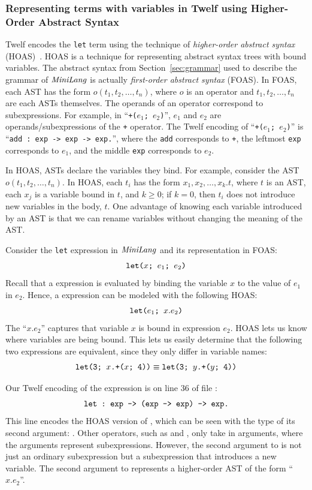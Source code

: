 \subsubsection{Representing terms with variables in Twelf
using Higher-Order Abstract Syntax}
\label{sec:twelf-hoas}

Twelf encodes the \texttt{let} term using the
technique of \emph{higher-order abstract syntax} (HOAS)~\cite{Twelf-HOAS}.
HOAS is a technique for representing abstract syntax trees
with bound variables.
The abstract syntax from Section~\ref{sec:grammar} used to describe
the grammar of $\mathit{MiniLang}$ is actually
\emph{first-order abstract syntax} (FOAS).
In FOAS, each AST has the form $o(t_1, t_2, \ldots, t_n)$,
where $o$ is an operator and $t_1, t_2, \ldots, t_n$ are each
ASTs themselves.
The operands of an operator correspond to subexpressions.
For example, in ``\texttt{+($e_1$; $e_2$)}'',
$e_1$ and $e_2$ are operands/subexpressions of the
\texttt{+} operator.
The Twelf encoding of ``\texttt{+($e_1$; $e_2$)}''
is ``\texttt{add : exp -> exp -> exp.}'',
where the \texttt{add} corresponds to \texttt{+},
the leftmost \texttt{exp} corresponds to $e_1$,
and the middle \texttt{exp} corresponds to $e_2$.

In HOAS, ASTs declare the variables they bind.
For example, consider the AST
$o(t_1, t_2, \ldots, t_n)$.
In HOAS, each $t_i$ has the form
$x_1, x_2, \ldots, x_k.t$, where $t$ is an AST,
each $x_j$ is a variable bound in $t$, and $k \geq 0$;
if $k = 0$, then $t_i$ does not introduce new variables in
the body, $t$.
One advantage of knowing each variable introduced by an AST
is that we can rename variables without changing the meaning
of the AST.

Consider the \texttt{let} expression in $\mathit{MiniLang}$ and
its representation in FOAS:
\[\texttt{let($x$; $e_1$; $e_2$)}\]
Recall that a  expression is evaluated by
binding the variable $x$ to the value of $e_1$ in $e_2$.
Hence, a  expression can be modeled with the
following HOAS:
\[\texttt{let($e_1$; $x.e_2$)}\]
The ``$x.e_2$'' captures that variable $x$ is bound in
expression $e_2$.
HOAS lets us know where variables are being bound.
This lets us easily determine that the following two expressions
are equivalent, since they only differ in variable names:
\[ \texttt{let(3; $x$.+($x$; 4))} \equiv \texttt{let(3; $y$.+($y$; 4))}\]

Our Twelf encoding of the  expression is on line 36
of file :
\[ \texttt{let :\ exp -> (exp -> exp) -> exp.} \]
This line encodes the HOAS version of ,
which can be seen with the type of its
second argument: .
Other operators, such as  and ,
only take in  arguments, where the arguments
represent subexpressions.
However, the second argument to  is not just an
ordinary subexpression but a subexpression that introduces
a new variable.
The second argument to  represents a higher-order
AST of the form ``$x.e_2$''.


